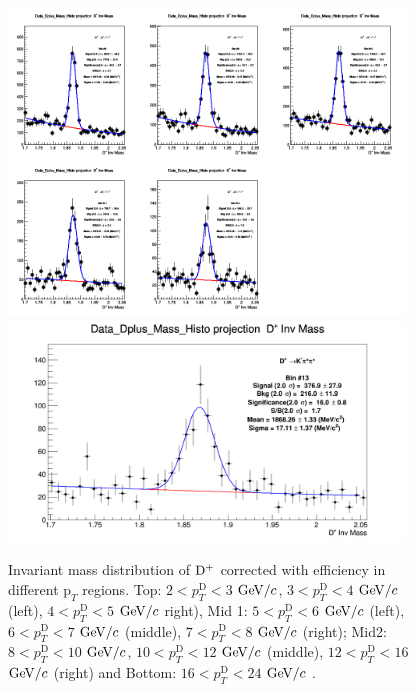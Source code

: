 \begin{figure}[h]
\centering
{\includegraphics[width=0.94\textwidth]{figures/DplusPlotsweff/InvMassDistributions_Dplus_Bins8to12.png}}
{\includegraphics[width=0.94\textwidth]{figures/DplusPlotsweff/InvMassDistributions_Dplus_Bins13to13.png}}
\caption{Invariant mass distribution of ${\rm D^+}$ corrected with efficiency in different $\text{p}_T$ regions. Top: $2< p_{T}^{\text{D}}< 3$ $\mathrm{GeV}/c$, $3< p_{T}^{\text{D}}< 4$ $\mathrm{GeV}/c$ (left), $4< p_{T}^{\text{D}}< 5$ $\mathrm{GeV}/c$ right), Mid 1: $5< p_{T}^{\text{D}}< 6$ $\mathrm{GeV}/c$ (left), $6 < p_{T}^{\text{D}} < 7$ $\mathrm{GeV}/c$ (middle), $7< p_{T}^{\text{D}}< 8$ $\mathrm{GeV}/c$ (right); Mid2: $8< p_{T}^{\text{D}}< 10$ $\mathrm{GeV}/c$, $10< p_{T}^{\text{D}}< 12$ $\mathrm{GeV}/c$  (middle), $12 < p_{T}^{\text{D}}< 16$ $\mathrm{GeV}/c$  (right) and Bottom: $16<p_{T}^{\text{D}}< 24$ $\mathrm{GeV}/c$ .}
\label{fig:InvMassDp}
\end{figure}

